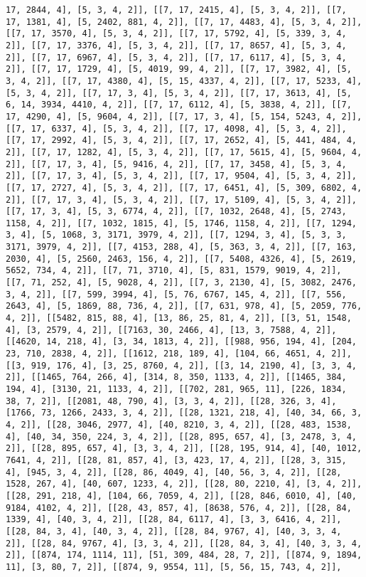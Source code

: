 \documentclass[12pt,fleqn]{article}\usepackage{../../common}
\begin{document}
\begin{verbatim}
17, 2844, 4], [5, 3, 4, 2]], [[7, 17, 2415, 4], [5, 3, 4, 2]], [[7, 17, 1381, 4], [5, 2402, 881, 4, 2]], [[7, 17, 4483, 4], [5, 3, 4, 2]], [[7, 17, 3570, 4], [5, 3, 4, 2]], [[7, 17, 5792, 4], [5, 339, 3, 4, 2]], [[7, 17, 3376, 4], [5, 3, 4, 2]], [[7, 17, 8657, 4], [5, 3, 4, 2]], [[7, 17, 6967, 4], [5, 3, 4, 2]], [[7, 17, 6117, 4], [5, 3, 4, 2]], [[7, 17, 1729, 4], [5, 4019, 99, 4, 2]], [[7, 17, 3982, 4], [5, 3, 4, 2]], [[7, 17, 4380, 4], [5, 15, 4337, 4, 2]], [[7, 17, 5233, 4], [5, 3, 4, 2]], [[7, 17, 3, 4], [5, 3, 4, 2]], [[7, 17, 3613, 4], [5, 6, 14, 3934, 4410, 4, 2]], [[7, 17, 6112, 4], [5, 3838, 4, 2]], [[7, 17, 4290, 4], [5, 9604, 4, 2]], [[7, 17, 3, 4], [5, 154, 5243, 4, 2]], [[7, 17, 6337, 4], [5, 3, 4, 2]], [[7, 17, 4098, 4], [5, 3, 4, 2]], [[7, 17, 2992, 4], [5, 3, 4, 2]], [[7, 17, 2652, 4], [5, 441, 484, 4, 2]], [[7, 17, 1282, 4], [5, 3, 4, 2]], [[7, 17, 5615, 4], [5, 9604, 4, 2]], [[7, 17, 3, 4], [5, 9416, 4, 2]], [[7, 17, 3458, 4], [5, 3, 4, 2]], [[7, 17, 3, 4], [5, 3, 4, 2]], [[7, 17, 9504, 4], [5, 3, 4, 2]], [[7, 17, 2727, 4], [5, 3, 4, 2]], [[7, 17, 6451, 4], [5, 309, 6802, 4, 2]], [[7, 17, 3, 4], [5, 3, 4, 2]], [[7, 17, 5109, 4], [5, 3, 4, 2]], [[7, 17, 3, 4], [5, 3, 6774, 4, 2]], [[7, 1032, 2648, 4], [5, 2743, 1158, 4, 2]], [[7, 1032, 1815, 4], [5, 1746, 1158, 4, 2]], [[7, 1294, 3, 4], [5, 1068, 3, 3171, 3979, 4, 2]], [[7, 1294, 3, 4], [5, 3, 3, 3171, 3979, 4, 2]], [[7, 4153, 288, 4], [5, 363, 3, 4, 2]], [[7, 163, 2030, 4], [5, 2560, 2463, 156, 4, 2]], [[7, 5408, 4326, 4], [5, 2619, 5652, 734, 4, 2]], [[7, 71, 3710, 4], [5, 831, 1579, 9019, 4, 2]], [[7, 71, 252, 4], [5, 9028, 4, 2]], [[7, 3, 2130, 4], [5, 3082, 2476, 3, 4, 2]], [[7, 599, 3994, 4], [5, 76, 6767, 145, 4, 2]], [[7, 556, 2643, 4], [5, 1869, 88, 736, 4, 2]], [[7, 631, 978, 4], [5, 2059, 776, 4, 2]], [[5482, 815, 88, 4], [13, 86, 25, 81, 4, 2]], [[3, 51, 1548, 4], [3, 2579, 4, 2]], [[7163, 30, 2466, 4], [13, 3, 7588, 4, 2]], [[4620, 14, 218, 4], [3, 34, 1813, 4, 2]], [[988, 956, 194, 4], [204, 23, 710, 2838, 4, 2]], [[1612, 218, 189, 4], [104, 66, 4651, 4, 2]], [[3, 919, 176, 4], [3, 25, 8760, 4, 2]], [[3, 14, 2190, 4], [3, 3, 4, 2]], [[1465, 764, 266, 4], [314, 8, 350, 1133, 4, 2]], [[1465, 384, 194, 4], [3130, 21, 1133, 4, 2]], [[702, 281, 965, 11], [226, 1834, 38, 7, 2]], [[2081, 48, 790, 4], [3, 3, 4, 2]], [[28, 326, 3, 4], [1766, 73, 1266, 2433, 3, 4, 2]], [[28, 1321, 218, 4], [40, 34, 66, 3, 4, 2]], [[28, 3046, 2977, 4], [40, 8210, 3, 4, 2]], [[28, 483, 1538, 4], [40, 34, 350, 224, 3, 4, 2]], [[28, 895, 657, 4], [3, 2478, 3, 4, 2]], [[28, 895, 657, 4], [3, 3, 4, 2]], [[28, 195, 914, 4], [40, 1012, 7641, 4, 2]], [[28, 81, 857, 4], [3, 423, 17, 4, 2]], [[28, 3, 315, 4], [945, 3, 4, 2]], [[28, 86, 4049, 4], [40, 56, 3, 4, 2]], [[28, 1528, 267, 4], [40, 607, 1233, 4, 2]], [[28, 80, 2210, 4], [3, 4, 2]], [[28, 291, 218, 4], [104, 66, 7059, 4, 2]], [[28, 846, 6010, 4], [40, 9184, 4102, 4, 2]], [[28, 43, 857, 4], [8638, 576, 4, 2]], [[28, 84, 1339, 4], [40, 3, 4, 2]], [[28, 84, 6117, 4], [3, 3, 6416, 4, 2]], [[28, 84, 3, 4], [40, 3, 4, 2]], [[28, 84, 9767, 4], [40, 3, 3, 4, 2]], [[28, 84, 9767, 4], [3, 3, 4, 2]], [[28, 84, 3, 4], [40, 3, 3, 4, 2]], [[874, 174, 1114, 11], [51, 309, 484, 28, 7, 2]], [[874, 9, 1894, 11], [3, 80, 7, 2]], [[874, 9, 9554, 11], [5, 56, 15, 743, 4, 2]], 
\end{verbatim}
\end{document}
